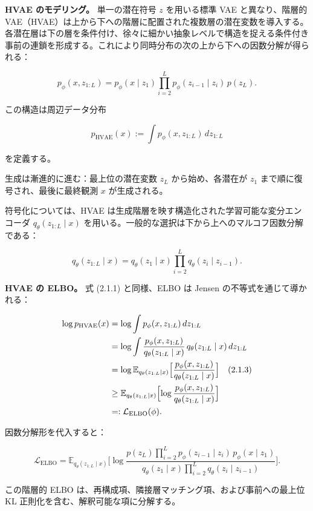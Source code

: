 \textbf{HVAE のモデリング。} 単一の潜在符号 $z$ を用いる標準 VAE と異なり、階層的 VAE（HVAE）は上から下への階層に配置された複数層の潜在変数を導入する。各潜在層は下の層を条件付け、徐々に細かい抽象レベルで構造を捉える条件付き事前の連鎖を形成する。これにより同時分布の次の上から下への因数分解が得られる：

\[
p_\phi(x, z_{1:L})
= p_\phi(x\mid z_1)\prod_{i=2}^{L} p_\phi(z_{i-1}\mid z_i)\, p(z_L).
\]


この構造は周辺データ分布

\[
p_{\mathrm{HVAE}}(x) := \int p_\phi(x, z_{1:L})\, dz_{1:L}
\]


を定義する。

生成は漸進的に進む：最上位の潜在変数 $z_L$ から始め、各潜在が $z_1$ まで順に復号され、最後に最終観測 $x$ が生成される。

符号化については、HVAE は生成階層を映す構造化された学習可能な変分エンコーダ $q_\theta(z_{1:L}\mid x)$ を用いる。一般的な選択は下から上へのマルコフ因数分解である：

\[
q_\theta(z_{1:L}\mid x)
= q_\theta(z_1\mid x)\prod_{i=2}^{L} q_\theta(z_i\mid z_{i-1}).
\]


\textbf{HVAE の ELBO。} 式 (2.1.1) と同様、ELBO は Jensen の不等式を通じて導かれる：

\begin{align*}
\begin{aligned}
\log p_{\mathrm{HVAE}}(x)
&= \log \int p_\phi(x, z_{1:L})\, dz_{1:L} \\
&= \log \int \frac{p_\phi(x, z_{1:L})}{q_\theta(z_{1:L}\mid x)}\, q_\theta(z_{1:L}\mid x)\, dz_{1:L} \\
&= \log \mathbb{E}_{q_\theta(z_{1:L}\mid x)}\Bigl[\frac{p_\phi(x, z_{1:L})}{q_\theta(z_{1:L}\mid x)}\Bigr] \quad (2.1.3) \\
&\ge \mathbb{E}_{q_\theta(z_{1:L}\mid x)}\Bigl[\log \frac{p_\phi(x, z_{1:L})}{q_\theta(z_{1:L}\mid x)}\Bigr] \\
&=: \mathcal{L}_{\mathrm{ELBO}}(\phi).
\end{aligned}
\end{align*}


因数分解形を代入すると：

\[
\mathcal{L}_{\mathrm{ELBO}}
= \mathbb{E}_{q_\theta(z_{1:L}\mid x)}
\Biggl[\log
\frac{p(z_L)\prod_{i=2}^{L} p_\phi(z_{i-1}\mid z_i)\, p_\phi(x\mid z_1)}
{q_\theta(z_1\mid x)\prod_{i=2}^{L} q_\theta(z_i\mid z_{i-1})}
\Biggr].
\]


この階層的 ELBO は、再構成項、隣接層マッチング項、および事前への最上位 KL 正則化を含む、解釈可能な項に分解する。

